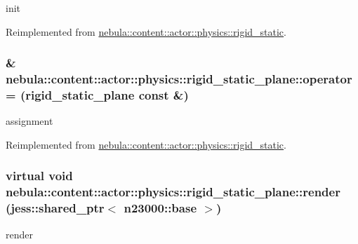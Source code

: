 init 

Reimplemented from \hyperlink{classnebula_1_1content_1_1actor_1_1physics_1_1rigid__static_a37aa702d9a31ff9529659343c6155482}{nebula::content::actor::physics::rigid\_\-static}.\hypertarget{classnebula_1_1content_1_1actor_1_1physics_1_1rigid__static__plane_a507d6d75754916f23d673205d53b3874}{
\subsubsection[{operator=}]{\& nebula::content::actor::physics::rigid\_\-static\_\-plane::operator= ({\bf rigid\_\-static\_\-plane} const \&)}}
\label{classnebula_1_1content_1_1actor_1_1physics_1_1rigid__static__plane_a507d6d75754916f23d673205d53b3874}


assignment 

Reimplemented from \hyperlink{classnebula_1_1content_1_1actor_1_1physics_1_1rigid__static_ae32ba52ca54bc1cc78572b931a98600d}{nebula::content::actor::physics::rigid\_\-static}.\hypertarget{classnebula_1_1content_1_1actor_1_1physics_1_1rigid__static__plane_af65fe2333f202fcf0dc9b95f00793c88}{
\subsubsection[{render}]{\setlength{\rightskip}{0pt plus 5cm}virtual void nebula::content::actor::physics::rigid\_\-static\_\-plane::render (jess::shared\_\-ptr$<$ {\bf n23000::base} $>$)}}
\label{classnebula_1_1content_1_1actor_1_1physics_1_1rigid__static__plane_af65fe2333f202fcf0dc9b95f00793c88}


render 

